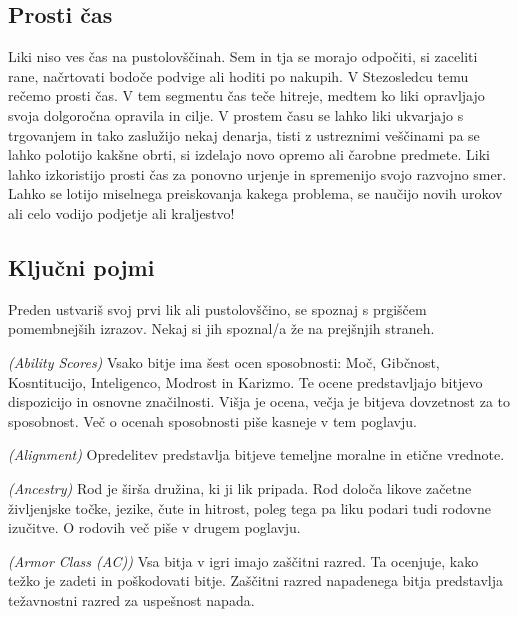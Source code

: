 \subsection{Prosti čas}
Liki niso ves čas na pustolovščinah. Sem in tja se morajo odpočiti, si zaceliti rane, načrtovati bodoče podvige ali hoditi po nakupih. V Stezosledcu temu rečemo prosti čas. V tem segmentu čas teče hitreje, medtem ko liki opravljajo svoja dolgoročna opravila in cilje. V prostem času se lahko liki ukvarjajo s trgovanjem in tako zaslužijo nekaj denarja, tisti z ustreznimi veščinami pa se lahko polotijo kakšne obrti, si izdelajo novo opremo ali čarobne predmete. Liki lahko izkoristijo prosti čas za ponovno urjenje in spremenijo svojo razvojno smer. Lahko se lotijo miselnega preiskovanja kakega problema, se naučijo novih urokov ali celo vodijo podjetje ali kraljestvo!

\subsection{Ključni pojmi}

Preden ustvariš svoj prvi lik ali pustolovščino, se spoznaj s prgiščem pomembnejših izrazov. Nekaj si jih spoznal/a že na prejšnjih straneh.

\newcommand{\rpgterm}[3]{%
    \begin{description}[leftmargin=!, labelwidth=20pt]
        \item[#1] \textit{(#2)} #3
    \end{description}}

\rpgterm{Ocene sposobnosti}{Ability Scores}{Vsako bitje ima šest ocen sposobnosti: Moč, Gibčnost, Kosntitucijo, Inteligenco, Modrost in Karizmo. Te ocene predstavljajo bitjevo dispozicijo in osnovne značilnosti. Višja je ocena, večja je bitjeva dovzetnost za to sposobnost. Več o ocenah sposobnosti piše kasneje v tem poglavju.}

\rpgterm{Opredelitev}{Alignment}{Opredelitev predstavlja bitjeve temeljne moralne in etične vrednote.}

\rpgterm{Rod}{Ancestry}{Rod je širša družina, ki ji lik pripada. Rod določa likove začetne življenjske točke, jezike, čute in hitrost, poleg tega pa liku podari tudi rodovne izučitve. O rodovih več piše v drugem poglavju.}

\rpgterm{Zaščitni razred (ZR)}{Armor Class (AC)}{Vsa bitja v igri imajo zaščitni razred. Ta ocenjuje, kako težko je zadeti in poškodovati bitje. Zaščitni razred napadenega bitja predstavlja težavnostni razred za uspešnost napada.}

